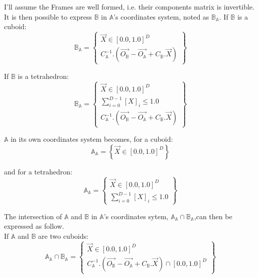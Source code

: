 \documentclass[12pt, a4paper]{article}
\begin{document}
I'll assume the Frames are well formed, i.e. their components matrix is invertible. It is then possible to express $\mathbb{B}$ in $\mathbb{A}$'s coordinates system, noted as $\mathbb{B}_\mathbb{A}$. If $\mathbb{B}$ is a cuboid:
\begin{equation}
\mathbb{B}_\mathbb{A}=\left\lbrace
\begin{array}{c}
\overrightarrow{X}\in[0.0,1.0]^D\\
C_\mathbb{A}^{-1}.(\overrightarrow{O_\mathbb{B}}-\overrightarrow{O_\mathbb{A}}+C_\mathbb{B}.\overrightarrow{X})
\end{array}
\right\rbrace
\end{equation}

If $\mathbb{B}$ is a tetrahedron:
\begin{equation}
\mathbb{B}_\mathbb{A}=\left\lbrace
\begin{array}{c}
\overrightarrow{X}\in[0.0,1.0]^D\\
\sum_{i=0}^{D-1}\left[X\right]_i\le1.0\\
C_\mathbb{A}^{-1}.(\overrightarrow{O_\mathbb{B}}-\overrightarrow{O_\mathbb{A}}+C_\mathbb{B}.\overrightarrow{X})
\end{array}
\right\rbrace
\end{equation}

$\mathbb{A}$ in its own coordinates system becomes, for a cuboid:
\begin{equation}
\mathbb{A}_\mathbb{A}=\left\lbrace\overrightarrow{X}\in[0.0,1.0]^D\right\rbrace
\end{equation}

and for a tetrahedron:
\begin{equation}
\mathbb{A}_\mathbb{A}=\left\lbrace
\begin{array}{c}
\overrightarrow{X}\in[0.0,1.0]^D\\
\sum_{i=0}^{D-1}\left[X\right]_i\le1.0
\end{array}
\right\rbrace
\end{equation}

The intersection of $\mathbb{A}$ and $\mathbb{B}$ in $\mathbb{A}$'s coordinates sytem, $\mathbb{A}_\mathbb{A}\cap\mathbb{B}_\mathbb{A}$,can then be expressed as follow.\\

If $\mathbb{A}$ and $\mathbb{B}$ are two cuboids:
\begin{equation}
\mathbb{A}_\mathbb{A}\cap\mathbb{B}_\mathbb{A}=\left\lbrace
\begin{array}{c}
\overrightarrow{X}\in[0.0,1.0]^D\\
C_\mathbb{A}^{-1}.\left(\overrightarrow{O_\mathbb{B}}-\overrightarrow{O_\mathbb{A}}+C_\mathbb{B}.\overrightarrow{X}\right)\cap[0.0,1.0]^D
\end{array}
\right\rbrace
\end{equation}
\end{document}
